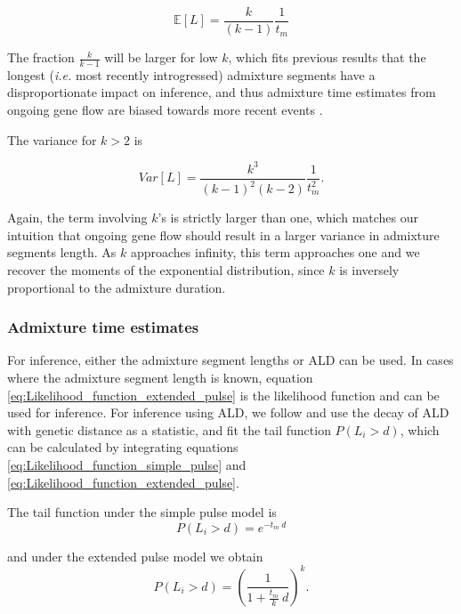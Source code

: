 \documentclass[]{article}
\begin{document}
\begin{equation}
\label{eq:Expected_l_extended_pulse}
\mathbb{E}[L] = \frac{k}{(k-1)}\frac{1}{t_{m}}
\end{equation}

The fraction $\frac{k}{k-1}$ will be larger for low $k$, which fits previous results that the longest (\emph{i.e.} most recently introgressed) admixture segments have a disproportionate impact on inference, and thus  admixture time estimates from ongoing gene flow are biased towards more recent events \citep{moorjani_history_2011,moorjani_genetic_2016}.

The variance for $k>2$ is 

\begin{equation}
\label{eq:Var_l_extended_pulse}
Var[L] = \frac{k^3}{(k-1)^2 (k-2)} \frac{1}{t_m^2}\text{.}
\end{equation}


Again, the term involving $k$'s is strictly larger than one, which matches our intuition that ongoing gene flow should result in a larger variance in admixture segments length. As $k$ approaches infinity, this term approaches one and we recover the moments of the exponential distribution, since $k$ is inversely proportional to the admixture duration.


\subsubsection{Admixture time estimates}\label{admixture time estimates}
For inference, either the admixture segment lengths or ALD can be used. In cases where the admixture segment length is known, equation \ref{eq:Likelihood_function_extended_pulse} is the likelihood function and can be used for inference. For inference using ALD,  we follow \cite{moorjani_history_2011} and use the decay of ALD with genetic distance as a statistic, and fit the tail function $P(L_i > d)$, which can be calculated by integrating equations \ref{eq:Likelihood_function_simple_pulse} and \ref{eq:Likelihood_function_extended_pulse}.

The tail function under the simple pulse model is 
\begin{equation}
\label{eq:simple_pulse_tail}
P(L_i > d) = e^{-t_m \:d}
\end{equation}

and under the extended pulse model we obtain 
\begin{equation}
\label{eq:extended_pulse_tail}
P(L_i > d) = \left( \frac{1}{1 + \frac{t_m}{k} \:d}\right) ^k \text{.}
\end{equation}
\end{document}
